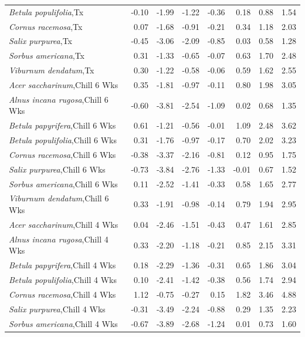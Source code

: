 \documentclass{article}\usepackage[]{graphicx}\usepackage[]{color}
\begin{document}
\begin{longtable}{lrrrrrrr}
  \textit{Betula populifolia},Tx & -0.10 & -1.99 & -1.22 & -0.36 & 0.18 & 0.88 & 1.54 \\ 
  \textit{Cornus racemosa},Tx & 0.07 & -1.68 & -0.91 & -0.21 & 0.34 & 1.18 & 2.03 \\ 
  \textit{Salix purpurea},Tx & -0.45 & -3.06 & -2.09 & -0.85 & 0.03 & 0.58 & 1.28 \\ 
  \textit{Sorbus americana},Tx & 0.31 & -1.33 & -0.65 & -0.07 & 0.63 & 1.70 & 2.48 \\ 
  \textit{Viburnum dendatum},Tx & 0.30 & -1.22 & -0.58 & -0.06 & 0.59 & 1.62 & 2.55 \\ 
  \textit{Acer saccharinum},Chill 6 Wks & 0.35 & -1.81 & -0.97 & -0.11 & 0.80 & 1.98 & 3.05 \\ 
  \textit{Alnus incana rugosa},Chill 6 Wks & -0.60 & -3.81 & -2.54 & -1.09 & 0.02 & 0.68 & 1.35 \\ 
  \textit{Betula papyrifera},Chill 6 Wks & 0.61 & -1.21 & -0.56 & -0.01 & 1.09 & 2.48 & 3.62 \\ 
  \textit{Betula populifolia},Chill 6 Wks & 0.31 & -1.76 & -0.97 & -0.17 & 0.70 & 2.02 & 3.23 \\ 
  \textit{Cornus racemosa},Chill 6 Wks & -0.38 & -3.37 & -2.16 & -0.81 & 0.12 & 0.95 & 1.75 \\ 
  \textit{Salix purpurea},Chill 6 Wks & -0.73 & -3.84 & -2.76 & -1.33 & -0.01 & 0.67 & 1.52 \\ 
  \textit{Sorbus americana},Chill 6 Wks & 0.11 & -2.52 & -1.41 & -0.33 & 0.58 & 1.65 & 2.77 \\ 
  \textit{Viburnum dendatum},Chill 6 Wks & 0.33 & -1.91 & -0.98 & -0.14 & 0.79 & 1.94 & 2.95 \\ 
  \textit{Acer saccharinum},Chill 4 Wks & 0.04 & -2.46 & -1.51 & -0.43 & 0.47 & 1.61 & 2.85 \\ 
  \textit{Alnus incana rugosa},Chill 4 Wks & 0.33 & -2.20 & -1.18 & -0.21 & 0.85 & 2.15 & 3.31 \\ 
  \textit{Betula papyrifera},Chill 4 Wks & 0.18 & -2.29 & -1.36 & -0.31 & 0.65 & 1.86 & 3.04 \\ 
  \textit{Betula populifolia},Chill 4 Wks & 0.10 & -2.41 & -1.42 & -0.38 & 0.56 & 1.74 & 2.94 \\ 
  \textit{Cornus racemosa},Chill 4 Wks & 1.12 & -0.75 & -0.27 & 0.15 & 1.82 & 3.46 & 4.88 \\ 
  \textit{Salix purpurea},Chill 4 Wks & -0.31 & -3.49 & -2.24 & -0.88 & 0.29 & 1.35 & 2.23 \\ 
  \textit{Sorbus americana},Chill 4 Wks & -0.67 & -3.89 & -2.68 & -1.24 & 0.01 & 0.73 & 1.60 \\ 

\end{longtable}
\end{document}
